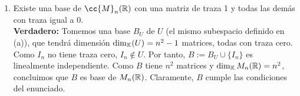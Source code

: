 \documentclass[12pt]{article}
\begin{document}
\begin{ejercicio}[2.5 puntos]
\begin{enumerate}
\begin{enumerate}
					\item  Existe una base de $\cc{M}_n(\R)$ con una matriz de traza 1 y todas las demás con traza igual
					a 0. \\
					\textbf{Verdadero:} Tomemos una base $B_U$ de $U$ (el mismo subespacio definido en (a)), que tendrá dimensión $\dim_{{\mathbb{K}}}(U) = n^2 - 1$ matrices, todas con traza cero. Como $I_n$ no tiene traza cero, $I_n \notin U$. Por tanto, $B := B_U \cup \{I_n\}$ es linealmente independiente. Como $B$ tiene $n^2$ matrices y $\dim_{{\mathbb{K}}} M_n({\mathbb{R}}) = n^2$, concluimos que $B$ es base de $M_n({\mathbb{R}})$. Claramente, $B$ cumple las condiciones del enunciado.\\
					
				\end{enumerate}
			\end{enumerate}
		\end{ejercicio}
	
\end{document}
